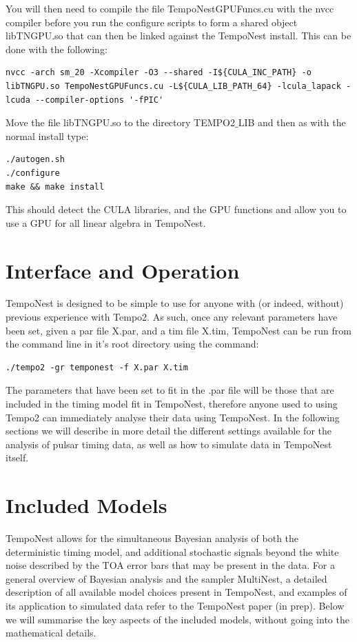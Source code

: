 \documentclass[%
 preprint,
 amsmath,amssymb,amsfonts,
 aps,
]{revtex4-1}
\begin{document}
You will then need to compile the file TempoNestGPUFuncs.cu with the nvcc compiler  before you run the configure scripts to form a shared object libTNGPU.so that can then be linked against the TempoNest install.  This can be done with the following:

\begin{lstlisting}
nvcc -arch sm_20 -Xcompiler -O3 --shared -I${CULA_INC_PATH} -o libTNGPU.so TempoNestGPUFuncs.cu -L${CULA_LIB_PATH_64} -lcula_lapack -lcuda --compiler-options '-fPIC' 
\end{lstlisting}
%


Move the file libTNGPU.so to the directory TEMPO2$\_$LIB and then as with the normal install type:
\begin{lstlisting}
./autogen.sh
./configure
make && make install
\end{lstlisting}
%
This should detect the CULA libraries, and the GPU functions and allow you to use a GPU for all linear algebra in TempoNest.


\section{Interface and Operation}
\label{Section:Interface}

TempoNest is designed to be simple to use for anyone with (or indeed, without) previous experience with Tempo2.  As such, once any relevant parameters have been set, given a par file X.par, and a tim file X.tim, TempoNest can be run from the command line in it's root directory using the command:
%
\begin{lstlisting}
./tempo2 -gr temponest -f X.par X.tim
\end{lstlisting}
%
The parameters that have been set to fit in the .par file will be those that are included in the timing model fit in TempoNest, therefore anyone used to using Tempo2 can immediately analyse their data using TempoNest.  In the following sections we will describe in more detail the different settings available for the analysis of pulsar timing data, as well as how to simulate data in TempoNest itself.


\section{Included Models}
\label{Section:Model}

TempoNest allows for the simultaneous Bayesian  analysis of both the deterministic timing model, and additional stochastic signals beyond the white noise described by the TOA error bars that may be present in the data.  For a general overview of Bayesian analysis and the sampler MultiNest, a detailed description of all available model choices present in TempoNest, and examples of its application to simulated data refer to the TempoNest paper (in prep).  Below we will summarise the key aspects of the included models, without going into the mathematical details.
\end{document}
